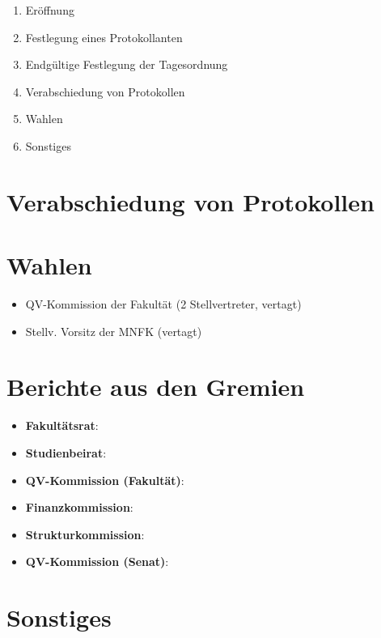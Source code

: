 \documentclass [titlepage] {article}
\begin{document}
\begin{enumerate}[{TOP} 1{:}]
	\setlength\itemsep{0,1 mm}
	\item Eröffnung
	\item Festlegung eines Protokollanten
	\item Endgültige Festlegung der Tagesordnung
	\item Verabschiedung von Protokollen
	\item Wahlen
	\item Sonstiges
\end{enumerate}

\section{Verabschiedung von Protokollen}

\section{Wahlen}
\begin{itemize}
	\item QV-Kommission der Fakultät (2 Stellvertreter, vertagt)\\
	\item Stellv. Vorsitz der MNFK (vertagt)\\[2mm]
\end{itemize}
\section{Berichte aus den Gremien}
\begin{itemize}
	\item \textbf{Fakultätsrat}: 	

	\item \textbf{Studienbeirat}: 	

	\item \textbf{QV-Kommission (Fakultät)}:	

	\item \textbf{Finanzkommission}:	

	\item \textbf{Strukturkommission}:	

	\item  \textbf{QV-Kommission (Senat)}:	
\end{itemize}

\section{Sonstiges}
\end{document}
